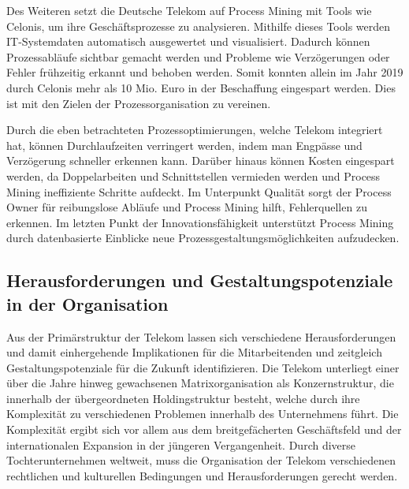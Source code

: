 \documentclass[12pt,a4paper]{article}
\newcommand{\zitat}[1]{\parencite{#1}}
\begin{document}
	\noindent Des Weiteren setzt die Deutsche Telekom auf Process Mining mit Tools wie
	Celonis, um ihre Geschäftsprozesse zu analysieren. Mithilfe dieses Tools
	werden IT-Systemdaten automatisch ausgewertet und visualisiert. Dadurch
	können Prozessabläufe sichtbar gemacht werden und Probleme wie
	Verzögerungen oder Fehler frühzeitig erkannt und behoben werden. Somit
	konnten allein im Jahr 2019 durch Celonis mehr als 10 Mio. Euro in der
	Beschaffung eingespart werden. \zitat{celonis2022} Dies ist mit den
	Zielen der Prozessorganisation zu vereinen.
	
	\noindent Durch die eben betrachteten Prozessoptimierungen, welche Telekom
	integriert hat, können Durchlaufzeiten verringert werden, indem man
	Engpässe und Verzögerung schneller erkennen kann. Darüber hinaus können
	Kosten eingespart werden, da Doppelarbeiten und Schnittstellen vermieden
	werden und Process Mining ineffiziente Schritte aufdeckt. Im Unterpunkt
	Qualität sorgt der Process Owner für reibungslose Abläufe und Process
	Mining hilft, Fehlerquellen zu erkennen. Im letzten Punkt der
	Innovationsfähigkeit unterstützt Process Mining durch datenbasierte
	Einblicke neue Prozessgestaltungsmöglichkeiten aufzudecken.
	
	\subsection{\texorpdfstring{Herausforderungen und Gestaltungspotenziale in der Organisation}{Herausforderungen und Gestaltungspotenziale in der Organisation }}\label{herausforderungen-und-gestaltungspotenziale-in-der-organisation}
	
	\noindent Aus der Primärstruktur der Telekom lassen sich verschiedene
	Herausforderungen und damit einhergehende Implikationen für die
	Mitarbeitenden und zeitgleich Gestaltungspotenziale für die Zukunft
	identifizieren. Die Telekom unterliegt einer über die Jahre hinweg
	gewachsenen Matrixorganisation als Konzernstruktur, die innerhalb der
	übergeordneten Holdingstruktur besteht, welche durch ihre Komplexität zu
	verschiedenen Problemen innerhalb des Unternehmens führt. Die
	Komplexität ergibt sich vor allem aus dem breitgefächerten Geschäftsfeld
	und der internationalen Expansion in der jüngeren Vergangenheit. Durch
	diverse Tochterunternehmen weltweit, muss die Organisation der Telekom
	verschiedenen rechtlichen und kulturellen Bedingungen und
	Herausforderungen gerecht werden.
	
\end{document}
